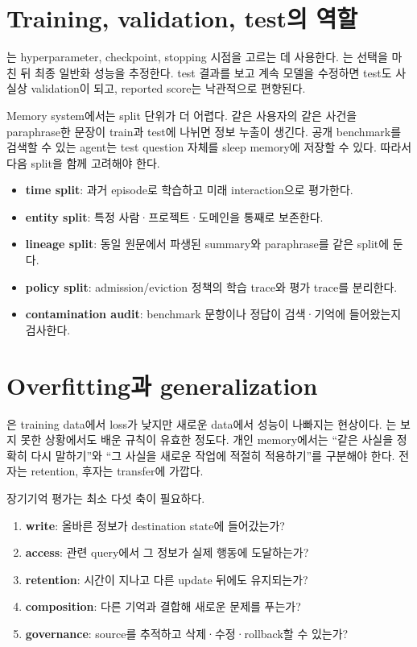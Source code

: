 \section{Training, validation, test의 역할}

는 hyperparameter, checkpoint, stopping 시점을 고르는 데
사용한다. 는 선택을 마친 뒤 최종 일반화 성능을 추정한다.
test 결과를 보고 계속 모델을 수정하면 test도 사실상 validation이 되고, reported score는
낙관적으로 편향된다.

Memory system에서는 split 단위가 더 어렵다. 같은 사용자의 같은 사건을 paraphrase한 문장이
train과 test에 나뉘면 정보 누출이 생긴다. 공개 benchmark를 검색할 수 있는 agent는 test
question 자체를 sleep memory에 저장할 수 있다. 따라서 다음 split을 함께 고려해야 한다.

\begin{itemize}
  \item \textbf{time split}: 과거 episode로 학습하고 미래 interaction으로 평가한다.
  \item \textbf{entity split}: 특정 사람·프로젝트·도메인을 통째로 보존한다.
  \item \textbf{lineage split}: 동일 원문에서 파생된 summary와 paraphrase를 같은 split에 둔다.
  \item \textbf{policy split}: admission/eviction 정책의 학습 trace와 평가 trace를 분리한다.
  \item \textbf{contamination audit}: benchmark 문항이나 정답이 검색·기억에 들어왔는지 검사한다.
\end{itemize}

\section{Overfitting과 generalization}

은 training data에서 loss가 낮지만 새로운 data에서 성능이
나빠지는 현상이다. 는 보지 못한 상황에서도 배운 규칙이
유효한 정도다. 개인 memory에서는 ``같은 사실을 정확히 다시 말하기''와 ``그 사실을 새로운
작업에 적절히 적용하기''를 구분해야 한다. 전자는 retention, 후자는 transfer에 가깝다.

장기기억 평가는 최소 다섯 축이 필요하다.

\begin{enumerate}
  \item \textbf{write}: 올바른 정보가 destination state에 들어갔는가?
  \item \textbf{access}: 관련 query에서 그 정보가 실제 행동에 도달하는가?
  \item \textbf{retention}: 시간이 지나고 다른 update 뒤에도 유지되는가?
  \item \textbf{composition}: 다른 기억과 결합해 새로운 문제를 푸는가?
  \item \textbf{governance}: source를 추적하고 삭제·수정·rollback할 수 있는가?
\end{enumerate}

